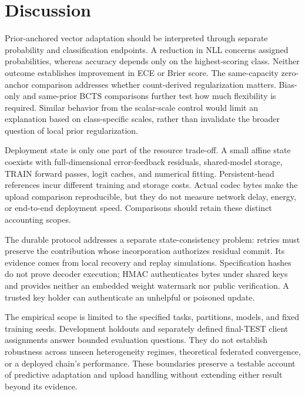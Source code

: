 \section{Discussion}

Prior-anchored vector adaptation should be interpreted through separate probability and classification endpoints. A reduction in NLL concerns assigned probabilities, whereas accuracy depends only on the highest-scoring class. Neither outcome establishes improvement in ECE or Brier score. The same-capacity zero-anchor comparison addresses whether count-derived regularization matters. Bias-only and same-prior BCTS comparisons further test how much flexibility is required. Similar behavior from the scalar-scale control would limit an explanation based on class-specific scales, rather than invalidate the broader question of local prior regularization.

Deployment state is only one part of the resource trade-off. A small affine state coexists with full-dimensional error-feedback residuals, shared-model storage, TRAIN forward passes, logit caches, and numerical fitting. Persistent-head references incur different training and storage costs. Actual codec bytes make the upload comparison reproducible, but they do not measure network delay, energy, or end-to-end deployment speed. Comparisons should retain these distinct accounting scopes.

The durable protocol addresses a separate state-consistency problem: retries must preserve the contribution whose incorporation authorizes residual commit. Its evidence comes from local recovery and replay simulations. Specification hashes do not prove decoder execution; HMAC authenticates bytes under shared keys and provides neither an embedded weight watermark nor public verification. A trusted key holder can authenticate an unhelpful or poisoned update.

The empirical scope is limited to the specified tasks, partitions, models, and fixed training seeds. Development holdouts and separately defined final-TEST client assignments answer bounded evaluation questions. They do not establish robustness across unseen heterogeneity regimes, theoretical federated convergence, or a deployed chain's performance. These boundaries preserve a testable account of predictive adaptation and upload handling without extending either result beyond its evidence.
